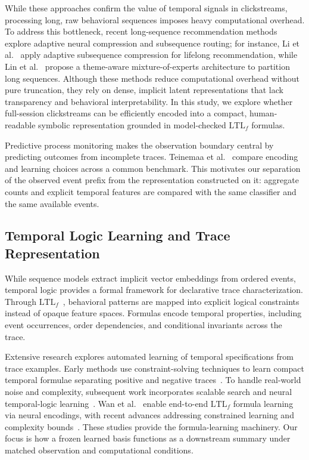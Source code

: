 \documentclass[sigconf,anonymous,nonacm]{acmart}
\newif\ifrevisions
\newcommand{\rev}[1]{\ifrevisions\textcolor{red}{#1}\else#1\fi}
\begin{document}
While these approaches confirm the value of temporal signals in clickstreams, processing long, raw behavioral sequences imposes heavy computational overhead. To address this bottleneck, recent long-sequence recommendation methods explore adaptive neural compression and subsequence routing; for instance, Li et al.~\cite{li2026lifelong} apply adaptive subsequence compression for lifelong recommendation, while Lin et al.~\cite{lin2026mixture} propose a theme-aware mixture-of-experts architecture to partition long sequences. Although these methods reduce computational overhead without pure truncation, they rely on dense, implicit latent representations that lack transparency and behavioral interpretability. In this study, we explore whether full-session clickstreams can be efficiently encoded into a compact, human-readable symbolic representation grounded in model-checked $\text{LTL}_f$ formulas.

\rev{Predictive process monitoring makes the observation boundary central by predicting outcomes from incomplete traces. Teinemaa et al.~\cite{teinemaa2019outcome} compare encoding and learning choices across a common benchmark. This motivates our separation of the observed event prefix from the representation constructed on it: aggregate counts and explicit temporal features are compared with the same classifier and the same available events.}

\subsection{Temporal Logic Learning and Trace Representation}

While sequence models extract implicit vector embeddings from ordered events, temporal logic provides a formal framework for declarative trace characterization. Through $\text{LTL}_f$~\cite{de2013linear}, behavioral patterns are mapped into explicit logical constraints instead of opaque feature spaces. \rev{Formulas encode temporal properties}, including event occurrences, order dependencies, and conditional invariants across the trace.

Extensive research explores automated learning of temporal specifications from trace examples. Early methods use constraint-solving techniques to learn compact temporal formulae separating positive and negative traces~\cite{neider2018learning,camacho2019learning}. To handle real-world noise and complexity, subsequent work incorporates scalable search and neural temporal-logic learning~\cite{gaglione2022maxsat,valizadeh2024ltl}. Wan et al.~\cite{wan2024end} enable end-to-end $\text{LTL}_f$ formula learning via neural encodings, with recent advances addressing constrained learning and complexity bounds~\cite{wan2024end,10.1109/ICSE55347.2025.00160,bordais2025complexity}. \rev{These studies provide the formula-learning machinery. Our focus is how a frozen learned basis functions as a downstream summary under matched observation and computational conditions.}
\end{document}
